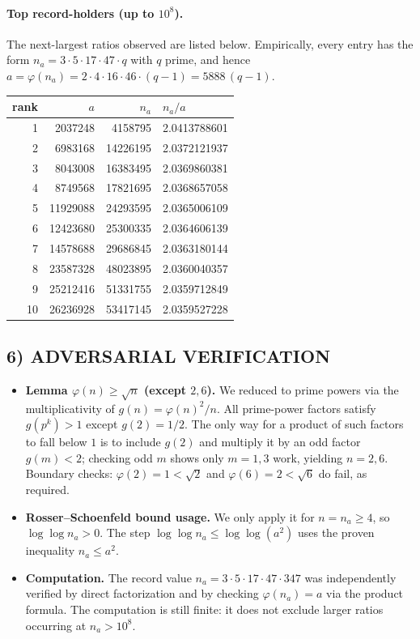 \paragraph{Top record-holders (up to $10^8$).}
The next-largest ratios observed are listed below.
Empirically, every entry has the form $n_a=3\cdot 5\cdot 17\cdot 47\cdot q$ with $q$ prime, and hence
$a=\varphi(n_a)=2\cdot 4\cdot 16\cdot 46\cdot (q-1)=5888\,(q-1)$.
\begin{center}
\begin{tabular}{r|r|r|l}
rank & $a$ & $n_a$ & $n_a/a$ \\\hline
1 & 2037248 & 4158795 & 2.0413788601\\
2 & 6983168 & 14226195 & 2.0372121937\\
3 & 8043008 & 16383495 & 2.0369860381\\
4 & 8749568 & 17821695 & 2.0368657058\\
5 & 11929088 & 24293595 & 2.0365006109\\
6 & 12423680 & 25300335 & 2.0364606139\\
7 & 14578688 & 29686845 & 2.0363180144\\
8 & 23587328 & 48023895 & 2.0360040357\\
9 & 25212416 & 51331755 & 2.0359712849\\
10 & 26236928 & 53417145 & 2.0359527228\\
\end{tabular}
\end{center}

\subsection*{6) ADVERSARIAL VERIFICATION}
\begin{itemize}
\item \textbf{Lemma $\varphi(n)\ge \sqrt n$ (except $2,6$).}
We reduced to prime powers via the multiplicativity of $g(n)=\varphi(n)^2/n$.
All prime-power factors satisfy $g(p^k)>1$ except $g(2)=1/2$.
The only way for a product of such factors to fall below $1$ is to include $g(2)$ and multiply it by an odd factor $g(m)<2$; checking odd $m$ shows only $m=1,3$ work, yielding $n=2,6$.
Boundary checks: $\varphi(2)=1<\sqrt2$ and $\varphi(6)=2<\sqrt6$ do fail, as required.
\item \textbf{Rosser--Schoenfeld bound usage.}
We only apply it for $n=n_a\ge 4$, so $\log\log n_a>0$.
The step $\log\log n_a\le \log\log(a^2)$ uses the proven inequality $n_a\le a^2$.
\item \textbf{Computation.}
The record value $n_a=3\cdot 5\cdot 17\cdot 47\cdot 347$ was independently verified by direct factorization and by checking $\varphi(n_a)=a$ via the product formula.
The computation is still finite: it does not exclude larger ratios occurring at $n_a>10^8$.
\end{itemize}

